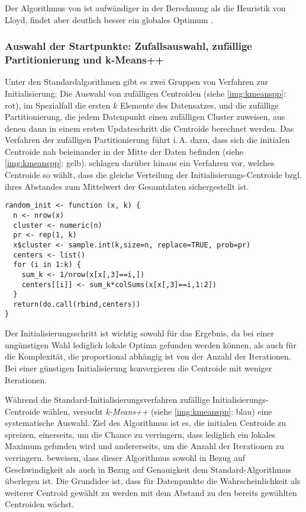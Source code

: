 \documentclass[a4paper,12pt,twoside]{article}
\newcommand{\Fachbegriff}[1]{\textit{#1}}
\begin{document}
Der Algorithmus von \textcite{Hartigan.1979} ist aufwändiger in der Berechnung als die Heuristik von Lloyd, findet aber deutlich besser ein globales Optimum \autocite{Slonim.2013}. 

\subsubsection{Auswahl der Startpunkte: Zufallsauswahl, zufällige Partitionierung und k-Means++}
\label{sec:start}
Unter den Standardalgorithmen gibt es zwei Gruppen von Verfahren zur Initialisierung: Die Auswahl von zufälligen Centroiden (siehe \autoref{img:kmeanspp}: rot), im Spezialfall die ersten $k$ Elemente des Datensatzes, und die zufällige Partitionierung, die jedem Datenpunkt einen zufälligen Cluster zuweisen, aus denen dann in einem ersten Updateschritt die Centroide berechnet werden. Das Verfahren der zufälligen Partitionierung führt i.\,A. dazu, dass sich die initialen Centroide nah beieinander in der Mitte der Daten befinden (siehe \autoref{img:kmeanspp}: gelb). \textcite[][103]{Hartigan.1979} schlagen darüber hinaus ein Verfahren vor, welches Centroide so wählt, dass die gleiche Verteilung der Initialisierungs-Centroide bzgl. ihres Abstandes zum Mittelwert der Gesamtdaten sichergestellt ist. 

\begin{lstlisting}[caption={Funktion Initialisierung Zufallpartitionierung in R}, label=list:random]
random_init <- function (x, k) {
  n <- nrow(x)
  cluster <- numeric(n)
  pr <- rep(1, k)
  x$cluster <- sample.int(k,size=n, replace=TRUE, prob=pr)
  centers <- list()
  for (i in 1:k) {
    sum_k <- 1/nrow(x[x[,3]==i,])
    centers[[i]] <- sum_k*colSums(x[x[,3]==i,1:2])
  }
  return(do.call(rbind,centers))
}
\end{lstlisting}

Der Initialisierungsschritt ist wichtig sowohl für das Ergebnis, da bei einer ungünstigen Wahl lediglich lokale Optima gefunden werden können, als auch für die Komplexität, die proportional abhängig ist von der Anzahl der Iterationen. Bei einer günstigen Initialisierung konvergieren die Centroide mit weniger Iterationen. 

Während die Standard-Initialisierungsverfahren zufällige Initialisierungs-Centroide wählen, versucht \Fachbegriff{k-Means++} (siehe \autoref{img:kmeanspp}: blau) eine systematische Auswahl. Ziel des Algorithmus ist es, die initialen Centroide zu spreizen, einerseits, um die Chance zu verringern, dass lediglich ein lokales Maximum gefunden wird und andererseits, um die Anzahl der Iterationen zu verringern. \textcite{Arthur.2007} beweisen, dass dieser Algorithmus sowohl in Bezug auf Geschwindigkeit als auch in Bezug auf Genauigkeit dem Standard-Algorithmus überlegen ist. Die Grundidee ist, dass für Datenpunkte die Wahrscheinlichkeit als weiterer Centroid gewählt zu werden mit dem Abstand zu den bereits gewählten Centroiden wächst. 
\end{document}
